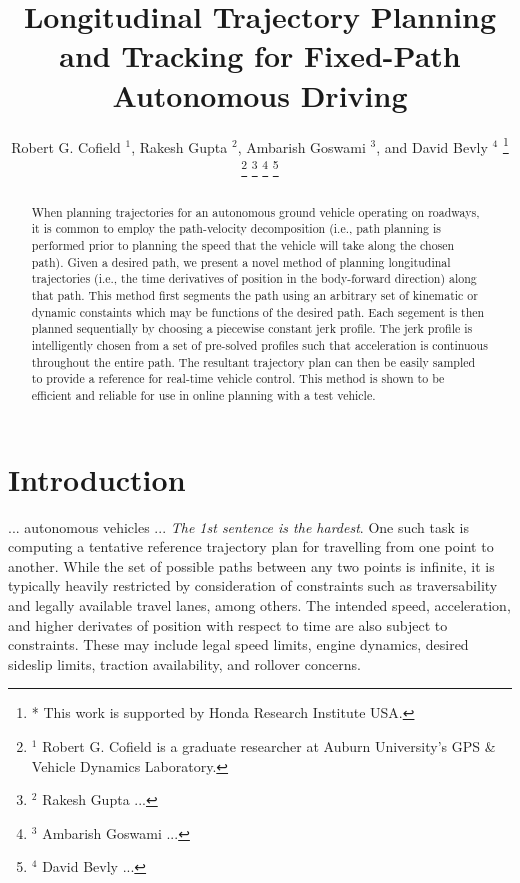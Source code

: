 \documentclass[letterpaper, 10 pt, conference]{ieeeconf}  %
\title{\LARGE \bf
  Longitudinal Trajectory Planning and Tracking for Fixed-Path Autonomous Driving
}
\author{
  Robert G. Cofield $^{1}$,
  Rakesh Gupta $^{2}$,
  Ambarish Goswami $^{3}$,
  and
  David Bevly $^{4}$
  \thanks{
    * This work is supported by Honda Research Institute USA.
  }
  \thanks{
    $^{1}$ Robert G. Cofield is a graduate researcher at Auburn University's GPS \& Vehicle Dynamics Laboratory.
  }
  \thanks{
    $^{2}$ Rakesh Gupta ...
  }
  \thanks{
    $^{3}$ Ambarish Goswami ... 
  }
  \thanks{
    $^{4}$ David Bevly ...
  }
}
\begin{document}
\maketitle
\thispagestyle{empty}
\pagestyle{empty}

\begin{abstract}

When planning trajectories for an autonomous ground vehicle operating on roadways, it is common to employ the path-velocity decomposition (i.e., path planning is performed prior to planning the speed that the vehicle will take along the chosen path).
Given a desired path, we present a novel method of planning longitudinal trajectories (i.e., the time derivatives of position in the body-forward direction) along that path.
This method first segments the path using an arbitrary set of kinematic or dynamic constaints which may be functions of the desired path.
Each segement is then planned sequentially by choosing a piecewise constant jerk profile.
The jerk profile is intelligently chosen from a set of pre-solved profiles such that acceleration is continuous throughout the entire path.
The resultant trajectory plan can then be easily sampled to provide a reference for real-time vehicle control.
This method is shown to be efficient and reliable for use in online planning with a test vehicle.

\end{abstract}

\section{Introduction}
\label{sec:introduction}

... autonomous vehicles ... \emph{The 1st sentence is the hardest}.
One such task is computing a tentative reference trajectory plan for travelling from one point to another.
While the set of possible paths between any two points is infinite, it is typically heavily restricted by consideration of constraints such as traversability and legally available travel lanes, among others.
The intended speed, acceleration, and higher derivates of position with respect to time are also subject to constraints.
These may include legal speed limits, engine dynamics, desired sideslip limits, traction availability, and rollover concerns.
\end{document}
